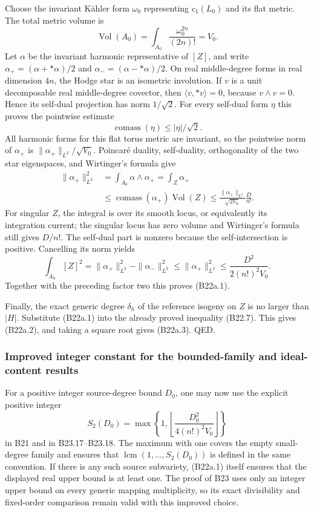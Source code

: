 Choose the invariant Kähler form \(\omega_0\) representing \(c_1(L_0)\) and its flat metric. The total metric volume is \[
 \operatorname{Vol}(A_0)=\int_{A_0}\frac{\omega_0^{2n}}{(2n)!}=V_0.
\] Let \(\alpha\) be the invariant harmonic representative of \([Z]\), and write \(\alpha_+=(\alpha+*\alpha)/2\) and \(\alpha_-=(\alpha-*\alpha)/2\). On real middle-degree forms in real dimension \(4n\), the Hodge star is an isometric involution. If \(v\) is a unit decomposable real middle-degree covector, then \(\langle v,*v\rangle=0\), because \(v\wedge v=0\). Hence its self-dual projection has norm \(1/\sqrt2\). For every self-dual form \(\eta\) this proves the pointwise estimate \[
 \operatorname{comass}(\eta)\le |\eta|/\sqrt2.
\] All harmonic forms for this flat torus metric are invariant, so the pointwise norm of \(\alpha_+\) is \(\|\alpha_+\|_{L^2}/\sqrt{V_0}\). Poincaré duality, self-duality, orthogonality of the two star eigenspaces, and Wirtinger's formula give \[
 \begin{aligned}
 \|\alpha_+\|_{L^2}^2
 &=\int_{A_0}\alpha\wedge\alpha_+
 =\int_Z\alpha_+\\
 &\le\operatorname{comass}(\alpha_+)\operatorname{Vol}(Z)
 \le\frac{\|\alpha_+\|_{L^2}}{\sqrt{2V_0}}\frac{D}{n!}.
 \end{aligned}
\tag{B22a.6}
\] For singular \(Z\), the integral is over its smooth locus, or equivalently its integration current; the singular locus has zero volume and Wirtinger's formula still gives \(D/n!\). The self-dual part is nonzero because the self-intersection is positive. Cancelling its norm yields \[
 \int_{A_0}[Z]^2
 =\|\alpha_+\|_{L^2}^2-\|\alpha_-\|_{L^2}^2
 \le\|\alpha_+\|_{L^2}^2
 \le\frac{D^2}{2(n!)^2V_0}.
\] Together with the preceding factor two this proves (B22a.1).

Finally, the exact generic degree \(\delta_h\) of the reference isogeny on \(Z\) is no larger than \(|H|\). Substitute (B22a.1) into the already proved inequality (B22.7). This gives (B22a.2), and taking a square root gives (B22a.3). QED.

\subsubsection{Improved integer constant for the bounded-family and ideal-content results}\label{improved-integer-constant-for-the-bounded-family-and-ideal-content-results}

For a positive integer source-degree bound \(D_0\), one may now use the explicit positive integer \[
 S_2(D_0)=\max\left\{1,
 \left\lfloor\frac{D_0^2}{4(n!)^2V_0}\right\rfloor\right\}
\tag{B22a.7}
\] in B21 and in B23.17--B23.18. The maximum with one covers the empty small-degree family and ensures that \(\operatorname{lcm}(1,\ldots,S_2(D_0))\) is defined in the same convention. If there is any such source subvariety, (B22a.1) itself ensures that the displayed real upper bound is at least one. The proof of B23 uses only an integer upper bound on every generic mapping multiplicity, so its exact divisibility and fixed-order comparison remain valid with this improved choice.

